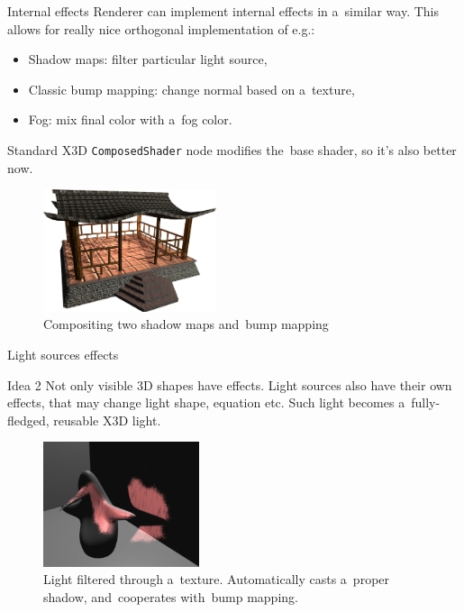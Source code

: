\documentclass{beamer}
\begin{document}
\begin{frame}{Internal effects}
Renderer can implement internal effects in a~similar way.
This allows for really nice orthogonal implementation of e.g.:

\begin{itemize}
  \item Shadow maps: filter particular light source,
  \item Classic bump mapping: change normal based on a~texture,
  \item Fog: mix final color with a~fog color.
\end{itemize}

Standard X3D \texttt{ComposedShader} node modifies the~base shader,
so it's also better now.

\begin{figure}
  \centering
  \includegraphics[width=2in]{../rhan_shrine_5_everything}
  \caption{Compositing two shadow maps and~bump mapping}
\end{figure}
\end{frame}


\begin{frame}{Light sources effects}
\begin{block}{Idea 2}
Not only visible 3D shapes have effects.
Light sources also have their own effects, that may change light
shape, equation etc. Such light becomes a~fully-fledged, reusable X3D light.
\end{block}

\begin{figure}
  \centering
  \includegraphics[width=1.8in]{../fancy_light_spot_shape}
  \caption{Light filtered through a~texture. Automatically casts a~proper shadow, and~cooperates with~bump mapping.}
\end{figure}
\end{frame}
\end{document}
